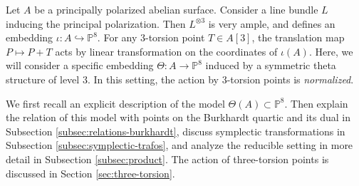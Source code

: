 \documentclass[11pt]{amsart}
\theoremstyle{definition}
\newcommand{\PP}{\mathbb{P}}
\begin{document}
Let $A$ be a principally polarized abelian surface. Consider a line bundle $L$ inducing the principal polarization. Then $L^{\otimes 3}$ is very ample, and defines an embedding $\iota:A \hookrightarrow\PP^8$. For any $3$-torsion point $T \in A[3]$, the translation map $P \mapsto P + T$ acts by linear transformation on the coordinates of $\iota(A)$. 
Here, we will consider a specific embedding $\Theta:A \to \PP^8$ induced by a symmetric theta structure of level $3$. In this setting, the action by $3$-torsion points is {\em normalized}.  

We first recall an explicit description of the model $\Theta(A) \subset \PP^8$. Then explain the relation of this model with points on the Burkhardt quartic and its dual in Subsection \ref{subsec:relations-burkhardt}, discuss symplectic transformations in Subsection \ref{subsec:symplectic-trafos}, and analyze the reducible setting in more detail in Subsection \ref{subsec:product}. The action of three-torsion points is discussed in Section \ref{sec:three-torsion}.
\end{document}
